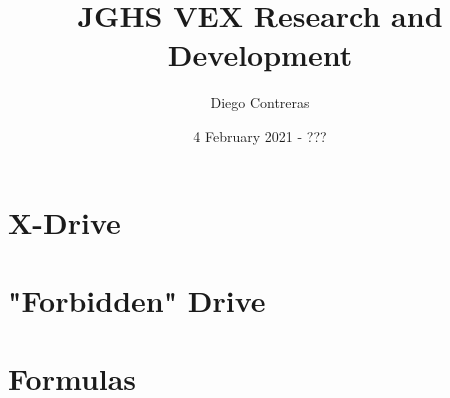 \documentclass[12pt]{article}
\title{JGHS VEX Research and Development}
\author{Diego Contreras}
\date{4 February 2021 - ???}
\begin{document}
\maketitle
\newpage
\tableofcontents



















\section{X-Drive}
\section{"Forbidden" Drive}
\section{Formulas}



\end{document}
